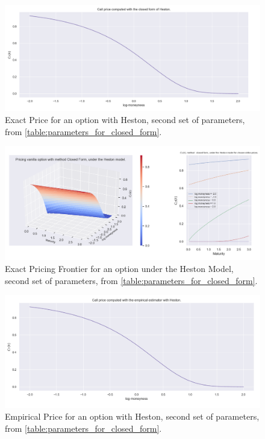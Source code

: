\begin{figure}
\centering
   \includegraphics[width = 0.75 \textwidth]{../addition_part/images/integration_fft/closed_price_1_new.png}
   \caption{Exact Price for an option with Heston, second set of parameters, from \ref{table:parameters_for_closed_form}.}
   \label{fig:new_param}
\end{figure}

\begin{figure}
\centering
   \includegraphics[width = 0.9 \textwidth]{../addition_part/images/integration_fft/closed_price_1000_new.png}
   \caption{Exact Pricing Frontier for an option under the Heston Model, second set of parameters, from \ref{table:parameters_for_closed_form}.}
   \label{fig:new_param2}
\end{figure}


\begin{figure}
\centering
   \includegraphics[width = 0.75 \textwidth]{../addition_part/images/integration_fft/empirical_pricing_5000_new.png}
   \caption{Empirical Price for an option with Heston, second set of parameters, from \ref{table:parameters_for_closed_form}.}
   \label{fig:new_param_estim}
\end{figure}

